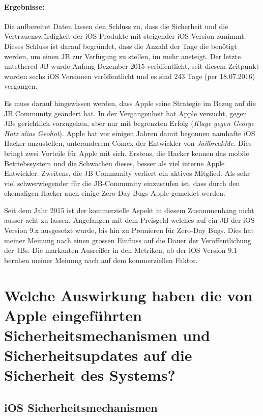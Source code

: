 \paragraph{Ergebnisse:} Die aufbereitet Daten lassen den Schluss zu, dass die Sicherheit und die Vertrauenswürdigkeit der iOS Produkte mit steigender iOS Version zunimmt. Dieses Schluss ist darauf begründet, dass die Anzahl der Tage die benötigt werden, um einen JB zur Verfügung zu stellen, im mehr ansteigt. Der letzte untethered JB wurde Anfang Dezember 2015 veröffentlicht, seit diesem Zeitpunkt wurden sechs iOS Versionen veröffentlicht und es sind 243 Tage (per 18.07.2016) vergangen.
\par 
Es muss darauf hingewissen werden, dass Apple seine Strategie im Bezug auf die JB Community geändert hat. In der Vergangenheit hat Apple versucht, gegen JBs gerichtlich vorzugehen, aber nur mit begrenzten Erfolg (\textit{\glqq Klage gegen George Hotz alias Geohot\grqq{}}). Apple hat vor einigen Jahren damit begonnen namhafte iOS Hacker anzustellen, unteranderem Comex  der Entwickler von \textit{\glqq JailbreakMe\grqq}. Dies bringt zwei Vorteile für Apple mit sich. Erstens, die Hacker kennen das mobile Betriebssystem und die Schwächen dieses, besser als viel interne Apple Entwickler.  Zweitens, die JB Community verliert ein aktives Mitglied. Als sehr viel schwerwiegender für die JB-Community einzustufen ist, dass durch den ehemaligen Hacker auch einige Zero-Day Bugs Apple gemeldet werden.\par
Seit dem Jahr 2015 ist der kommerzielle Aspekt in diesem Zusammenhang nicht ausser acht zu lassen. Angefangen mit dem Preisgeld welches auf ein JB der iOS Version 9.x ausgesetzt wurde, bis hin zu Premieren für Zero-Day Bugs. Dies hat meiner Meinung nach einen grossen Einfluss auf die Dauer der Veröffentlichung der JBs. Die markanten Ausreißer in den Metriken, ab der iOS Version 9.1 beruhen meiner Meinung nach auf dem kommerziellen Faktor. 

\newpage
\section{Welche Auswirkung haben die von Apple eingeführten Sicherheitsmechanismen und Sicherheitsupdates auf die Sicherheit des Systems?}
\label{sec:Frage2}
\subsection{iOS Sicherheitsmechanismen}
\label{sec:Frage2SecMechanismen}
 
